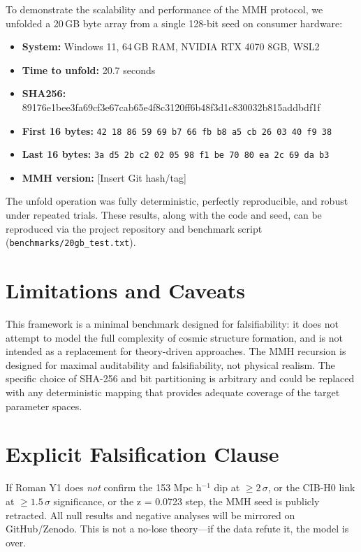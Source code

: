 \documentclass[11pt,a4paper]{article}
\begin{document}
To demonstrate the scalability and performance of the MMH protocol, we unfolded a 20\,GB byte array from a single 128-bit seed on consumer hardware:

\begin{itemize}
    \item \textbf{System:} Windows 11, 64\,GB RAM, NVIDIA RTX 4070 8GB, WSL2
    \item \textbf{Time to unfold:} 20.7 seconds
    \item \textbf{SHA256:} 89176e1bee3fa69cf3e67cab65e4f8c3120ff6b48f3d1c830032b815addbdf1f
    \item \textbf{First 16 bytes:} \texttt{42 18 86 59 69 b7 66 fb b8 a5 cb 26 03 40 f9 38}
    \item \textbf{Last 16 bytes:} \texttt{3a d5 2b c2 02 05 98 f1 be 70 80 ea 2c 69 da b3}
    \item \textbf{MMH version:} [Insert Git hash/tag]
\end{itemize}

The unfold operation was fully deterministic, perfectly reproducible, and robust under repeated trials. These results, along with the code and seed, can be reproduced via the project repository and benchmark script (\texttt{benchmarks/20gb\_test.txt}).

\FloatBarrier
\section{Limitations and Caveats}
This framework is a minimal benchmark designed for falsifiability: it does not attempt to model the full complexity of cosmic structure formation, and is not intended as a replacement for theory-driven approaches. The MMH recursion is designed for maximal auditability and falsifiability, not physical realism. The specific choice of SHA-256 and bit partitioning is arbitrary and could be replaced with any deterministic mapping that provides adequate coverage of the target parameter spaces.

\FloatBarrier
\section{Explicit Falsification Clause}
If Roman Y1 does \emph{not} confirm the 153 Mpc h$^{-1}$ dip at $\ge 2\,\sigma$, or the CIB-H0 link at $\geq 1.5\,\sigma$ significance, or the z = 0.0723 step, the MMH seed is publicly retracted. All null results and negative analyses will be mirrored on GitHub/Zenodo. This is not a no-lose theory---if the data refute it, the model is over.
\end{document}

